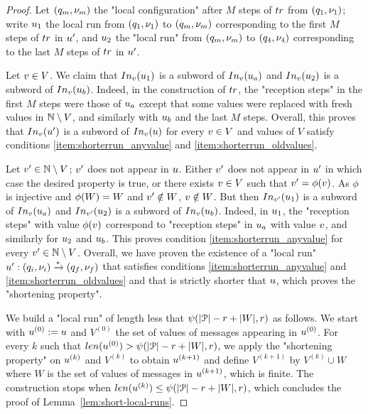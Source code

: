 \begin{proof}
	Let $(q_m, \nu_m)$ the "local configuration" after $M$ steps of $\atrace$ from $(q_1, \nu_1)$; write $u_1$ the local run from $(q_1,\nu_1)$ to $(q_m, \nu_m)$ corresponding to the first $M$ steps of $\atrace$ in $u'$, and $u_2$ the "local run" from $(q_m, \nu_m)$ to $(q_4, \nu_4)$ corresponding to the last $M$ steps of $\atrace$ in $u'$.  
	
	Let $v \in V$. We claim that $\vinput{\aval}{\localrun_{1}}$ is a subword of $\vinput{\aval}{\localrun_a}$ and $\vinput{\aval}{\localrun_{2}}$ is a subword of $\vinput{\aval}{\localrun_b}$. Indeed, in the construction of $\atrace$, the "reception steps" in the first $M$ steps were those of $u_a$ except that some values were replaced with fresh values in $\mathbb{N} \setminus V$, and similarly with $u_b$ and the last $M$ steps. Overall, this proves that $\vinput{\aval}{\localrun'}$ is a subword of $\vinput{\aval}{\localrun}$ for every $v \in V$ and values of $V$ satisfy conditions \ref{item:shorterrun_anyvalue} and \ref{item:shorterrun_oldvalues}. 
	
	Let $v' \in \mathbb{N} \setminus V$; $v'$ does not appear in $u$. Either $v'$ does not appear in $u'$ in which case the desired property is true, or there exists $v \in V$ such that $v' = \phi(v)$. As $\phi$ is injective and $\phi(W) = W$ and $v'\notin W$, $v \notin W$. 
	But then $\vinput{\aval'}{\localrun_{1}}$ is a subword of $\vinput{\aval}{\localrun_a}$ and $\vinput{\aval'}{\localrun_{2}}$ is a subword of $\vinput{\aval}{\localrun_b}$. Indeed, in $u_1$, the "reception steps" with value $\phi(v)$ correspond to "reception steps" in $u_a$ with value $v$, and similarly for $u_2$ and $u_b$. This proves condition \ref{item:shorterrun_anyvalue} for every $v' \in \mathbb{N} \setminus V$.
	Overall, we have proven the existence of a "local run" $u': (q_i,\nu_i) \xrightarrow{*} (q_f,\nu_f)$ that satisfies conditions \ref{item:shorterrun_anyvalue} and \ref{item:shorterrun_oldvalues} and that is strictly shorter that $u$, which proves the "shortening property".
	
	We build a "local run" of length less that $\psi(|\mathcal{P}|-r+|W|,r)$ as follows. We start with $u^{(0)} := u$ and $V^{(0)}$ the set of values of messages appearing in $u^{(0)}$. For every $k$ such that $\length{\localrun^{(0)}} > \towerfun(\size{\prot}-r+\size{\Vinit},\regnum)$, we apply the "shortening property" on $u^{(k)}$ and $V^{(k)}$ to obtain $u^{(k+1)}$ and define $V^{(k+1)}$ by $V^{(k)} \cup W$ where $W$ is the set of values of messages in $u^{(k+1)}$, which is finite.
	The construction stops when $\length{\localrun^{(k)}} \leq \towerfun(\size{\prot}-r + \size{\Vinit},\regnum)$, which concludes the proof of Lemma~\ref{lem:short-local-runs}. 
\end{proof}

